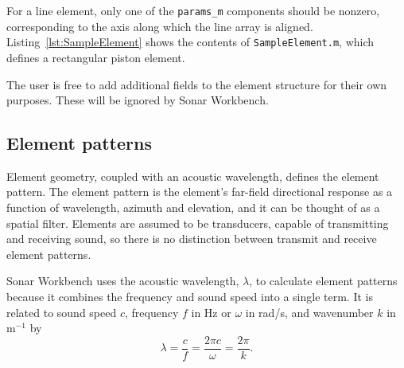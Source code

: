 For a line element, only one of the \texttt{params\_m} components should be nonzero, corresponding to the axis along which the line array is aligned. Listing~\ref{lst:SampleElement} shows the contents of \texttt{SampleElement.m}, which defines a rectangular piston element.



The user is free to add additional fields to the element structure for their own purposes. These will be ignored by Sonar Workbench.

\subsection{Element patterns}

Element geometry, coupled with an acoustic wavelength, defines the element pattern. The element pattern is the element's far-field directional response as a function of wavelength, azimuth and elevation, and it can be thought of as a spatial filter. Elements are assumed to be transducers, capable of transmitting and receiving sound, so there is no distinction between transmit and receive element patterns. 

Sonar Workbench uses the acoustic wavelength, $\lambda$, to calculate element patterns because it combines the frequency and sound speed into a single term. It is related to sound speed $c$, frequency $f$ in Hz or $\omega$ in rad/s, and wavenumber $k$ in m$^{-1}$ by
\begin{equation*}
\lambda = \frac{c}{f} = \frac{2\pi{c}}{\omega} = \frac{2\pi}{k}.
\end{equation*}

